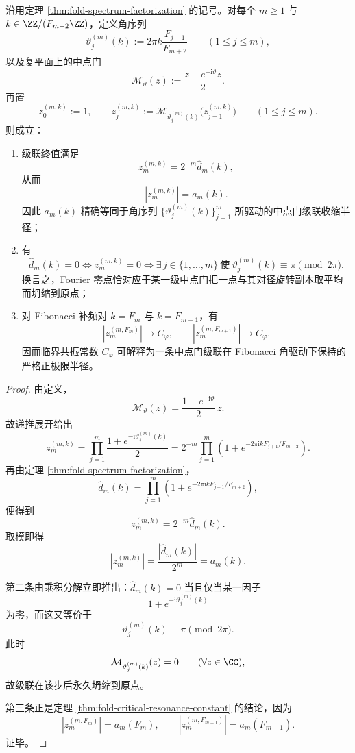 \begin{theorem}\label{thm:xi-time-part9p1-midpoint-gate-cascade-critical-radius}
沿用定理 \ref{thm:fold-spectrum-factorization} 的记号。对每个 \(m\ge 1\) 与 \(k\in\ZZ/(F_{m+2}\ZZ)\)，定义角序列
\[
\vartheta_j^{(m)}(k):=
2\pi k\frac{F_{j+1}}{F_{m+2}}
\qquad (1\le j\le m),
\]
以及复平面上的中点门
\[
\mathcal M_{\vartheta}(z):=\frac{z+e^{-\mathrm{i}\vartheta}z}{2}.
\]
再置
\[
z_0^{(m,k)}:=1,
\qquad
z_j^{(m,k)}:=\mathcal M_{\vartheta_j^{(m)}(k)}\bigl(z_{j-1}^{(m,k)}\bigr)
\qquad (1\le j\le m).
\]
则成立：
\begin{enumerate}
  \item 级联终值满足
  \[
  \boxed{\;
  z_m^{(m,k)}
  =
  2^{-m}\widehat d_m(k),\;}
  \]
  从而
  \[
  \boxed{\;
  |z_m^{(m,k)}|=a_m(k).\;}
  \]
  因此 \(a_m(k)\) 精确等同于角序列 \(\{\vartheta_j^{(m)}(k)\}_{j=1}^{m}\) 所驱动的中点门级联收缩半径；
  \item 有
  \[
  \widehat d_m(k)=0
  \iff
  z_m^{(m,k)}=0
  \iff
  \exists\, j\in\{1,\dots,m\}\ \text{使}\ 
  \vartheta_j^{(m)}(k)\equiv \pi\pmod{2\pi}.
  \]
  换言之，Fourier 零点恰对应于某一级中点门把一点与其对径旋转副本取平均而坍缩到原点；
  \item 对 Fibonacci 补频对 \(k=F_m\) 与 \(k=F_{m+1}\)，有
  \[
  |z_m^{(m,F_m)}|\longrightarrow C_\varphi,
  \qquad
  |z_m^{(m,F_{m+1})}|\longrightarrow C_\varphi.
  \]
  因而临界共振常数 \(C_\varphi\) 可解释为一条中点门级联在 Fibonacci 角驱动下保持的严格正极限半径。
\end{enumerate}
\end{theorem}
\begin{proof}
由定义，
\[
\mathcal M_{\vartheta}(z)=\frac{1+e^{-\mathrm{i}\vartheta}}{2}\,z.
\]
故递推展开给出
\[
z_m^{(m,k)}
=
\prod_{j=1}^{m}\frac{1+e^{-\mathrm{i}\vartheta_j^{(m)}(k)}}{2}
=
2^{-m}\prod_{j=1}^{m}\left(1+e^{-2\pi \mathrm{i}kF_{j+1}/F_{m+2}}\right).
\]
再由定理 \ref{thm:fold-spectrum-factorization}，
\[
\widehat d_m(k)=\prod_{j=1}^{m}\left(1+e^{-2\pi \mathrm{i}kF_{j+1}/F_{m+2}}\right),
\]
便得到
\[
z_m^{(m,k)}=2^{-m}\widehat d_m(k).
\]
取模即得
\[
|z_m^{(m,k)}|=\frac{|\widehat d_m(k)|}{2^m}=a_m(k).
\]

第二条由乘积分解立即推出：\(\widehat d_m(k)=0\) 当且仅当某一因子
\[
1+e^{-\mathrm{i}\vartheta_j^{(m)}(k)}
\]
为零，而这又等价于
\[
\vartheta_j^{(m)}(k)\equiv \pi\pmod{2\pi}.
\]
此时
\[
\mathcal M_{\vartheta_j^{(m)}(k)}(z)=0
\qquad (\forall z\in\CC),
\]
故级联在该步后永久坍缩到原点。

第三条正是定理 \ref{thm:fold-critical-resonance-constant} 的结论，因为
\[
|z_m^{(m,F_m)}|=a_m(F_m),
\qquad
|z_m^{(m,F_{m+1})}|=a_m(F_{m+1}).
\]
证毕。
\end{proof}

\endinput
